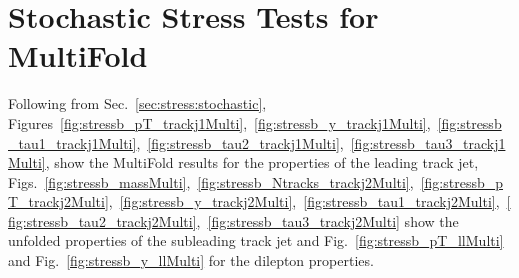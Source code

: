 \documentclass[NOTE, atlasdraft=true, texlive=2016, UKenglish]{\ATLASLATEXPATH atlasdoc}
\begin{document}
\section{Stochastic Stress Tests for MultiFold}
\label{sec:stressBmultifolddet}

Following from Sec.~\ref{sec:stress:stochastic}, Figures~\ref{fig:stressb_pT_trackj1Multi},~\ref{fig:stressb_y_trackj1Multi},~\ref{fig:stressb_tau1_trackj1Multi},~\ref{fig:stressb_tau2_trackj1Multi},~\ref{fig:stressb_tau3_trackj1Multi}, show the MultiFold results for the properties of the leading track jet, Figs.~\ref{fig:stressb_massMulti},~\ref{fig:stressb_Ntracks_trackj2Multi},~\ref{fig:stressb_pT_trackj2Multi},~\ref{fig:stressb_y_trackj2Multi},~\ref{fig:stressb_tau1_trackj2Multi},~\ref{fig:stressb_tau2_trackj2Multi},~\ref{fig:stressb_tau3_trackj2Multi} show the unfolded properties of the subleading track jet and Fig.~\ref{fig:stressb_pT_llMulti} and Fig.~\ref{fig:stressb_y_llMulti} for the dilepton properties.

\begin{figure}[h!]
\centering
{}\\
\\
\end{figure}
\end{document}
